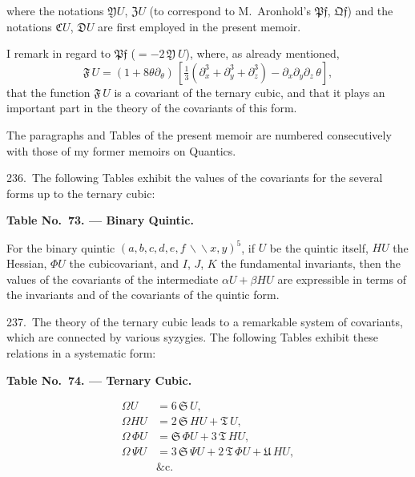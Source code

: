 \documentclass[11pt,a4paper]{book}
\begin{document}
where the notations $\mathfrak{Y}U$, $\mathfrak{Z}U$ (to correspond to M.~Aronhold's $\mathfrak{P}\mathfrak{f}$, $\mathfrak{Q}\mathfrak{f}$) and the notations $\mathfrak{C}U$, $\mathfrak{D}U$ are first employed in the present memoir.

\newpage
\setcounter{page}{332}

I remark in regard to $\mathfrak{P}\mathfrak{f}$ ($=-2\,\mathfrak{Y}\,U$), where, as already mentioned,
\[
\mathfrak{F}\,U = (1+8\theta\partial_\theta)\,[\tfrac{1}{3}(\partial_x^3+\partial_y^3+\partial_z^3)-\partial_x\partial_y\partial_z\,\theta],
\]
that the function $\mathfrak{F}\,U$ is a covariant of the ternary cubic, and that it plays an important part in the theory of the covariants of this form.

\newpage
\setcounter{page}{333}

The paragraphs and Tables of the present memoir are numbered consecutively with those of my former memoirs on Quantics.

236.\ The following Tables exhibit the values of the covariants for the several forms up to the ternary cubic:

\begin{center}
\textbf{Table No.~73. --- Binary Quintic.}
\end{center}

For the binary quintic $(a,b,c,d,e,f\,\backslash\!\!\backslash x,y)^5$, if $U$ be the quintic itself, $HU$ the Hessian, $\Phi U$ the cubicovariant, and $I$, $J$, $K$ the fundamental invariants, then the values of the covariants of the intermediate $\alpha U+\beta HU$ are expressible in terms of the invariants and of the covariants of the quintic form.

237.\ The theory of the ternary cubic leads to a remarkable system of covariants, which are connected by various syzygies. The following Tables exhibit these relations in a systematic form:

\begin{center}
\textbf{Table No.~74. --- Ternary Cubic.}
\end{center}

\begin{align*}
\Omega U &= 6\,\mathfrak{S}\,U,\\
\Omega HU &= 2\,\mathfrak{S}\,HU+\mathfrak{T}\,U,\\
\Omega\,\Phi U &= \mathfrak{S}\,\Phi U+3\,\mathfrak{T}\,HU,\\
\Omega\,\Psi U &= 3\,\mathfrak{S}\,\Psi U+2\,\mathfrak{T}\,\Phi U+\mathfrak{U}\,HU,\\
&\text{\&c.}
\end{align*}
\end{document}
